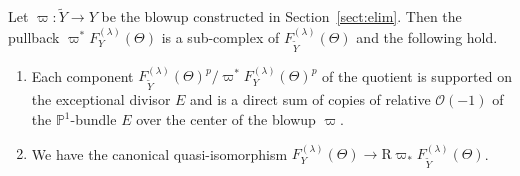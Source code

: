 \documentclass[pdftex]{sigma}
\newcommand{\PP}{\mathbb{P}}
\newcommand{\sO}{\mathscr{O}}
\newcommand{\ddRH}{\Theta}
\newcommand{\RD}{\mathrm{R}}
\begin{document}
\begin{lemma*} Let $\varpi\colon \widetilde{Y} \to Y$ be the blowup constructed in Section~{\rm \ref{sect:elim}}. Then the pullback $\varpi^*F_Y^{(\lambda)}(\ddRH)$ is a sub-complex of $F_{\widetilde{Y}}^{(\lambda)}(\ddRH)$
and the following hold.
\begin{enumerate}\itemsep=0pt
\item Each component $F_{\widetilde{Y}}^{(\lambda)}(\ddRH)^p/\varpi^*F_Y^{(\lambda)}(\ddRH)^p$ of the quotient is supported on the exceptional divisor $E$ and is a direct sum of copies of relative $\sO(-1)$ of the $\PP^1$-bundle $E$ over the center of the blowup $\varpi$.
\item We have the canonical quasi-isomorphism $F_Y^{(\lambda)}(\ddRH) \to \RD\varpi_*F_{\widetilde{Y}}^{(\lambda)}(\ddRH)$.
\end{enumerate}
\end{lemma*}
\end{document}
